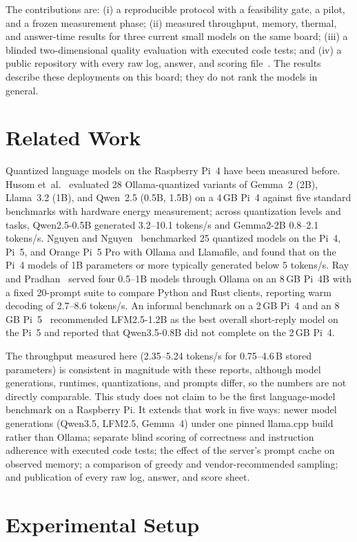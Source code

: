 \documentclass[conference]{IEEEtran}
\begin{document}
The contributions are: (i) a reproducible protocol with a feasibility gate, a pilot, and a frozen measurement phase; (ii) measured throughput, memory, thermal, and answer-time results for three current small models on the same board; (iii) a blinded two-dimensional quality evaluation with executed code tests; and (iv) a public repository with every raw log, answer, and scoring file~\cite{repo}. The results describe these deployments on this board; they do not rank the models in general.

\section{Related Work}
Quantized language models on the Raspberry Pi~4 have been measured before. Husom et~al.~\cite{husom2025} evaluated 28 Ollama-quantized variants of Gemma~2 (2B), Llama~3.2 (1B), and Qwen~2.5 (0.5B, 1.5B) on a 4\,GB Pi~4 against five standard benchmarks with hardware energy measurement; across quantization levels and tasks, Qwen2.5-0.5B generated 3.2--10.1 tokens/s and Gemma2-2B 0.8--2.1 tokens/s. Nguyen and Nguyen~\cite{nguyen2025} benchmarked 25 quantized models on the Pi~4, Pi~5, and Orange Pi~5 Pro with Ollama and Llamafile, and found that on the Pi~4 models of 1B parameters or more typically generated below 5 tokens/s. Ray and Pradhan~\cite{ray2026} served four 0.5--1B models through Ollama on an 8\,GB Pi~4B with a fixed 20-prompt suite to compare Python and Rust clients, reporting warm decoding of 2.7--8.6 tokens/s. An informal benchmark on a 2\,GB Pi~4 and an 8\,GB Pi~5~\cite{simeon2026} recommended LFM2.5-1.2B as the best overall short-reply model on the Pi~5 and reported that Qwen3.5-0.8B did not complete on the 2\,GB Pi~4.

The throughput measured here (2.35--5.24 tokens/s for 0.75--4.6\,B stored parameters) is consistent in magnitude with these reports, although model generations, runtimes, quantizations, and prompts differ, so the numbers are not directly comparable. This study does not claim to be the first language-model benchmark on a Raspberry Pi. It extends that work in five ways: newer model generations (Qwen3.5, LFM2.5, Gemma~4) under one pinned llama.cpp build rather than Ollama; separate blind scoring of correctness and instruction adherence with executed code tests; the effect of the server's prompt cache on observed memory; a comparison of greedy and vendor-recommended sampling; and publication of every raw log, answer, and score sheet.

\section{Experimental Setup}
\end{document}
